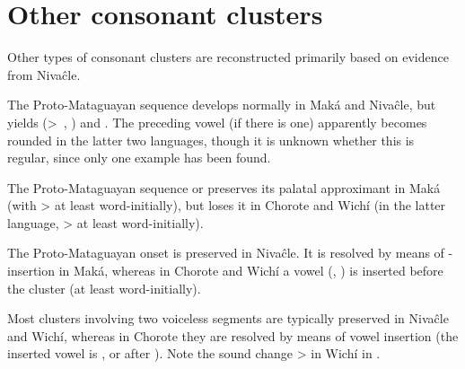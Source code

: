 \begin{exe}
    \ex \plaj
    \ex \distal
    \ex \bathe
    \ex \soul
    \ex \recipient \label{recipient-yh-h}
\end{exe}

\section{Other consonant clusters}\label{clusters}
Other types of consonant clusters are reconstructed primarily based on evidence from Nivaĉle.

The Proto-Mataguayan sequence  develops normally in Maká and Nivaĉle, but yields  (>~, ) and . The preceding vowel (if there is one) apparently becomes rounded in the latter two languages, though it is unknown whether this is regular, since only one example has been found.

\begin{exe}
    \ex \bite
    \ex \earkfe
    \ex \frighten
\end{exe}

The Proto-Mataguayan sequence  or  preserves its palatal approximant in Maká (with  >  at least word-initially), but loses it in Chorote and Wichí (in the latter language,  >  at least word-initially).

\begin{exe}
    \ex \smelln
    \ex \cavy
\end{exe}

The Proto-Mataguayan onset  is preserved in Nivaĉle. It is resolved by means of \mbox{-}insertion in Maká, whereas in Chorote and Wichí a vowel (, ) is inserted before the cluster (at least word-initially).

\begin{exe}
    \ex \whitequebracho
    \ex \kingvulture
    \ex \cardon
    \ex \chachalaca
\end{exe}

Most clusters involving two voiceless segments are typically preserved in Nivaĉle and Wichí, whereas in Chorote they are resolved by means of vowel insertion (the inserted vowel is , or  after ). Note the sound change  >  in Wichí in .

\begin{exe}
    \ex \north
    \ex \tortoise
    \ex \whitealgarrobof
    \ex \dovesipup
    \ex \toad \label{ts-toad}
    \ex \precipice
\end{exe}

